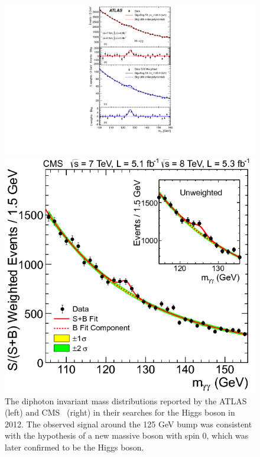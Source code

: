 \begin{figure}[tbh!]
 \begin{center}
 \begin{minipage}[b]{0.5\linewidth} 
 \includegraphics[width=\textwidth]{figures/Part1/Field/ATLAS} 
 \vspace{1em}
 \end{minipage}
 \hfill
 \begin{minipage}[b]{0.45\linewidth} 
 \includegraphics[width=\textwidth]{figures/Part1/Field/CMS}
 \end{minipage}
 \caption{The diphoton invariant mass distributions reported by the ATLAS~\cite{ATLAS:2012yve} (left) and CMS~\cite{CMS:2012qbp} (right) in their searches for the Higgs boson in 2012. The observed signal around the 125 GeV bump was consistent with the hypothesis of a new massive boson with spin 0, which was later confirmed to be the Higgs boson.}
 \label{fig:Hgg}
 \end{center}
\end{figure}